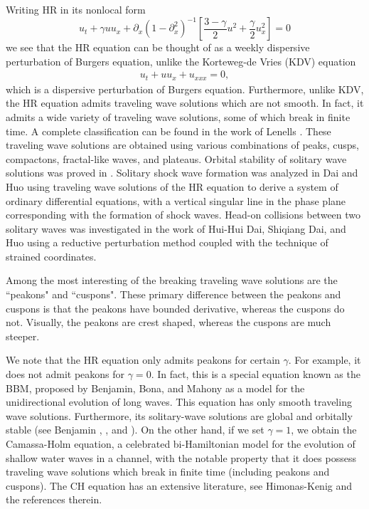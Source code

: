 \documentclass[12pt,reqno]{amsart}
\newcommand{\p}{\partial}
\begin{document}
Writing HR in its nonlocal form
$$
u_{t} + \gamma u u_{x}+ \p_{x} (1 - \p_{x}^{2})^{-1} \left [ \frac{3 - \gamma}{2}u^{2} + \frac{\gamma}{2} u_{x}^{2} \right ]=0
$$
we see that the HR equation can be thought of as a 
weekly dispersive perturbation of
Burgers equation, unlike the Korteweg-de Vries (KDV) equation
\begin{align}
     u_{t} + u u_{x} + u_{xxx}=0,
\end{align}
which is a dispersive perturbation of Burgers equation.
%
Furthermore, unlike KDV,
the HR equation admits traveling wave solutions which are not smooth. In fact,
it admits a wide variety of traveling wave solutions, some of which break in
finite time. A complete classification can be found in the work of Lenells
\cite{Lenells_2006_Traveling-waves}.  These traveling wave solutions are
obtained using various combinations of peaks, cusps, compactons, fractal-like
waves, and plateaus. Orbital stability of solitary wave solutions was proved in
\cite{Constantin_2000_Stability-of-a-}.  Solitary shock wave formation was
analyzed in Dai and Huo \cite{Dai_2000_Solitary-shock-} using traveling wave
solutions of the HR equation to derive a system of ordinary differential
equations, with a vertical singular line in the phase plane corresponding with
the formation of shock waves. Head-on collisions between two solitary waves was
investigated in the work of Hui-Hui Dai, Shiqiang Dai, and Huo
\cite{Dai_2000_Head-on-collisi} using a reductive perturbation method coupled
with the technique of strained coordinates. 

Among the most interesting of the breaking
traveling wave solutions are the ``peakons" and
``cuspons". These primary difference between the peakons and cuspons is that the
peakons have bounded derivative, whereas the cuspons do not. Visually, the
peakons are crest shaped, whereas the cuspons are much steeper. 

We note that the HR equation only admits peakons for certain $\gamma$. 
For example, it does not admit peakons for $\gamma = 0$. In fact, this is a
special equation known as the BBM, proposed by 
Benjamin, Bona, and Mahony 
\cite{Benjamin_1972_Model-equations} as a model for 
the unidirectional evolution of long waves. This equation has only smooth
traveling wave solutions. Furthermore, 
its solitary-wave solutions are global and orbitally stable (see Benjamin 
\cite{Benjamin_1972_The-stability-o}, 
\cite{Benjamin_1972_Model-equations}, and 
\cite{Constantin_2000_Stability-of-a-}).
On the other hand, if we set $\gamma =1$, we obtain the Camassa-Holm equation, a celebrated bi-Hamiltonian
model for the evolution of shallow water waves in a channel, with the notable
property that it does possess traveling wave solutions which break in
finite time (including peakons and cuspons). The CH equation has an extensive
literature, see Himonas-Kenig \cite{Himonas_2010_Non-uniform-dep-per} and the references
therein.
\end{document}
